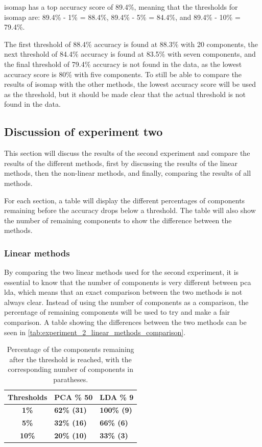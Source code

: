isomap has a top accuracy score of 89.4\%, meaning that the thresholds for \gls{isomap}  are: 89.4\% - 1\% = 88.4\%, 89.4\% - 5\% = 84.4\%, and 89.4\% - 10\% = 79.4\%. 

The first threshold of 88.4\% accuracy is found at 88.3\% with 20 components, the next threshold of 84.4\% accuracy is found at 83.5\% with seven components, and the final threshold of 79.4\% accuracy is not found in the data, as the lowest accuracy score is 80\% with five components. To still be able to compare the results of \gls{isomap}  with the other methods, the lowest accuracy score will be used as the threshold, but it should be made clear that the actual threshold is not found in the data.


\subsection{Discussion of experiment two}\label{subsec:experiment_2_discussion}
This section will discuss the results of the second experiment and compare the results of the different methods, first by discussing the results of the linear methods, then the non-linear methods, and finally, comparing the results of all methods.

For each section, a table will display the different percentages of components remaining before the accuracy drops below a threshold. The table will also show the number of remaining components to show the difference between the methods.


\subsubsection{Linear methods}
By comparing the two linear methods used for the second experiment, it is essential to know that the number of components is very different between \gls{pca} \gls{lda}, which means that an exact comparison between the two methods is not always clear. Instead of using the number of components as a comparison, the percentage of remaining components will be used to try and make a fair comparison. A table showing the differences between the two methods can be seen in \autoref{tab:experiment_2_linear_methods_comparison}.

\begin{table}[htb!]
    \centering
    \begin{tabular}{cp{}p{}}
        \toprule
        \textbf{Thresholds} & \textbf{PCA \% 50} & \textbf{LDA \% 9} \\
        \midrule
        \textbf{1\%} & \textbf{62\% (31)} & \textbf{100\% (9)} \\
        \textbf{5\%} & \textbf{32\% (16)} & \textbf{66\% (6)} \\
        \textbf{10\%} & \textbf{20\% (10)} & \textbf{33\% (3)} \\
        \bottomrule
    \end{tabular}
    \caption{Percentage of the components remaining after the threshold is reached, with the corresponding number of components in paratheses.}
    \label{tab:experiment_2_linear_methods_comparison}
\end{table}

